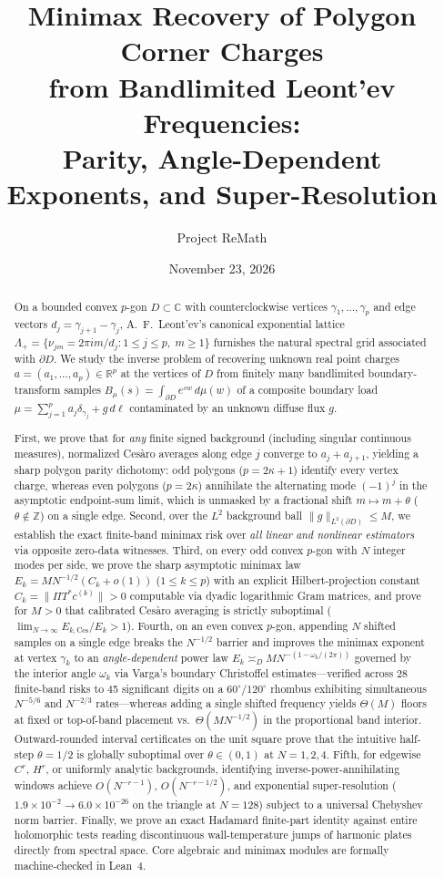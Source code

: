 \documentclass[11pt,reqno]{amsart}
\title[Minimax Recovery of Polygon Corner Charges]{Minimax Recovery of Polygon Corner Charges\\
from Bandlimited Leont'ev Frequencies:\\
Parity, Angle-Dependent Exponents, and Super-Resolution}
\author{Project ReMath}
\date{November 23, 2026}
\theoremstyle{definition}
\theoremstyle{remark}
\newcommand{\C}{\mathbb{C}}
\newcommand{\R}{\mathbb{R}}
\newcommand{\Z}{\mathbb{Z}}
\begin{document}
\begin{abstract}
On a bounded convex $p$-gon $D \subset \C$ with counterclockwise vertices $\gamma_1,\dots,\gamma_p$ and edge vectors $d_j = \gamma_{j+1}-\gamma_j$, A.~F.~Leont'ev's canonical exponential lattice $\Lambda_+ = \{\nu_{jm} = 2\pi i m / d_j : 1 \le j \le p,\; m \ge 1\}$ furnishes the natural spectral grid associated with $\partial D$. We study the inverse problem of recovering unknown real point charges $a = (a_1,\dots,a_p) \in \R^p$ at the vertices of $D$ from finitely many bandlimited boundary-transform samples $B_\mu(s) = \int_{\partial D} e^{sw}\,d\mu(w)$ of a composite boundary load $\mu = \sum_{j=1}^p a_j \delta_{\gamma_j} + g\,d\ell$ contaminated by an unknown diffuse flux $g$.

First, we prove that for \emph{any} finite signed background (including singular continuous measures), normalized Ces\`aro averages along edge $j$ converge to $a_j + a_{j+1}$, yielding a sharp polygon parity dichotomy: odd polygons ($p = 2\kappa+1$) identify every vertex charge, whereas even polygons ($p = 2\kappa$) annihilate the alternating mode $(-1)^j$ in the asymptotic endpoint-sum limit, which is unmasked by a fractional shift $m \mapsto m + \theta$ ($\theta \notin \Z$) on a single edge. Second, over the $L^2$ background ball $\|g\|_{L^2(\partial D)} \le M$, we establish the exact finite-band minimax risk over \emph{all linear and nonlinear estimators} via opposite zero-data witnesses. Third, on every odd convex $p$-gon with $N$ integer modes per side, we prove the sharp asymptotic minimax law $E_k = M N^{-1/2}(C_k + o(1))$ ($1 \le k \le p$) with an explicit Hilbert-projection constant $C_k = \|\Pi T^* c^{(k)}\| > 0$ computable via dyadic logarithmic Gram matrices, and prove for $M > 0$ that calibrated Ces\`aro averaging is strictly suboptimal ($\lim_{N\to\infty} E_{k,\mathrm{Ces}}/E_k > 1$). Fourth, on an even convex $p$-gon, appending $N$ shifted samples on a single edge breaks the $N^{-1/2}$ barrier and improves the minimax exponent at vertex $\gamma_k$ to an \emph{angle-dependent} power law $E_k \asymp_D M N^{-(1 - \omega_k/(2\pi))}$ governed by the interior angle $\omega_k$ via Varga's boundary Christoffel estimates---verified across 28 finite-band risks to 45 significant digits on a $60^\circ/120^\circ$ rhombus exhibiting simultaneous $N^{-5/6}$ and $N^{-2/3}$ rates---whereas adding a single shifted frequency yields $\Theta(M)$ floors at fixed or top-of-band placement vs.\ $\Theta(M N^{-1/2})$ in the proportional band interior. Outward-rounded interval certificates on the unit square prove that the intuitive half-step $\theta = 1/2$ is globally suboptimal over $\theta \in (0,1)$ at $N = 1, 2, 4$. Fifth, for edgewise $C^r$, $H^r$, or uniformly analytic backgrounds, identifying inverse-power-annihilating windows achieve $O(N^{-r-1})$, $O(N^{-r-1/2})$, and exponential super-resolution ($1.9\times 10^{-2} \to 6.0\times 10^{-26}$ on the triangle at $N=128$) subject to a universal Chebyshev norm barrier. Finally, we prove an exact Hadamard finite-part identity against entire holomorphic tests reading discontinuous wall-temperature jumps of harmonic plates directly from spectral space. Core algebraic and minimax modules are formally machine-checked in Lean~4.
\end{abstract}
\end{document}
